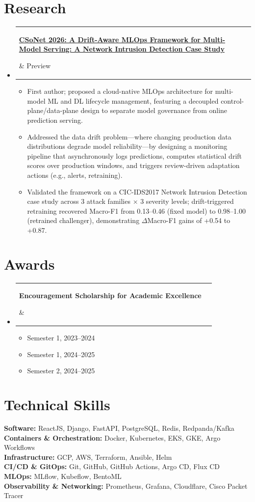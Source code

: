 \documentclass[letterpaper,11pt]{article}
\makeatletter
\newcommand{\resumeItem}[1]{
  \item\small{{#1 \vspace{-2pt}}}
}
\newcommand{\resumeProjectHeading}[2]{
    \item
    \begin{tabular*}{0.97\textwidth}{p{0.78\textwidth}@{\extracolsep{\fill}}r}
      \small#1 & #2 \\
    \end{tabular*}\vspace{-7pt}
}
\newcommand{\resumeSubHeadingListStart}{\begin{itemize}[leftmargin=0.15in, label={}]}
\newcommand{\resumeSubHeadingListEnd}{\end{itemize}}
\newcommand{\resumeItemListStart}{\begin{itemize}[leftmargin=0.18in]}
\newcommand{\resumeItemListEnd}{\end{itemize}\vspace{-5pt}}
\makeatother
\begin{document}
\section{Research}
\resumeSubHeadingListStart
  \resumeProjectHeading
    {\parbox[t]{0.79\textwidth}{\textbf{\href{https://csonet-conf.github.io/csonet26/index.html}{CSoNet 2026: A Drift-Aware MLOps Framework for Multi-Model Serving: A Network Intrusion Detection Case Study}}}}{Preview}
  \resumeItemListStart
    \resumeItem{First author; proposed a cloud-native MLOps architecture for multi-model ML and DL lifecycle management, featuring a decoupled control-plane/data-plane design to separate model governance from online prediction serving.}
    \resumeItem{Addressed the data drift problem---where changing production data distributions degrade model reliability---by designing a monitoring pipeline that asynchronously logs predictions, computes statistical drift scores over production windows, and triggers review-driven adaptation actions (e.g., alerts, retraining).}
    \resumeItem{Validated the framework on a CIC-IDS2017 Network Intrusion Detection case study across 3 attack families $\times$ 3 severity levels; drift-triggered retraining recovered Macro-F1 from 0.13--0.46 (fixed model) to 0.98--1.00 (retrained challenger), demonstrating $\Delta$Macro-F1 gains of +0.54 to +0.87.}
  \resumeItemListEnd
\resumeSubHeadingListEnd

\section{Awards}
\resumeSubHeadingListStart
  \resumeProjectHeading
    {\parbox[t]{0.79\textwidth}{\textbf{Encouragement Scholarship for Academic Excellence}}}{}
  \resumeItemListStart
    \resumeItem{Semester 1, 2023--2024}
    \resumeItem{Semester 1, 2024--2025}
    \resumeItem{Semester 2, 2024--2025}
  \resumeItemListEnd
\resumeSubHeadingListEnd

\section{Technical Skills}
\begin{itemize}[leftmargin=0.15in, label={}]
  \small{\item{
    \textbf{Software:} ReactJS, Django, FastAPI, PostgreSQL, Redis, Redpanda/Kafka \\
    \textbf{Containers \& Orchestration:} Docker, Kubernetes, EKS, GKE, Argo Workflows \\
    \textbf{Infrastructure:} GCP, AWS, Terraform, Ansible, Helm \\
    \textbf{CI/CD \& GitOps:} Git, GitHub, GitHub Actions, Argo CD, Flux CD \\
    \textbf{MLOps:} MLflow, Kubeflow, BentoML \\
    \textbf{Observability \& Networking:} Prometheus, Grafana, Cloudflare, Cisco Packet Tracer
  }}
\end{itemize}
\end{document}
